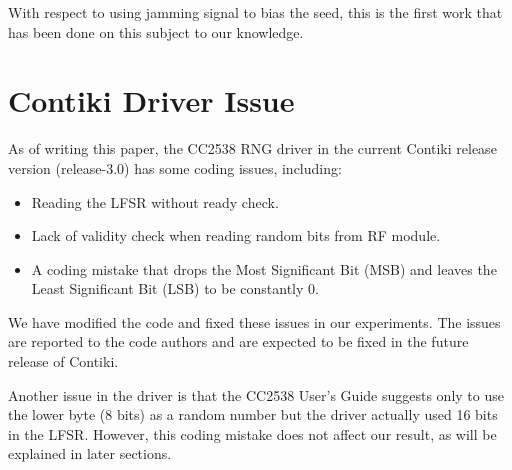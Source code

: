 With respect to using jamming signal to bias the seed, this is the first work that has been done on this subject to our knowledge.

\section{Contiki Driver Issue}
As of writing this paper,  the CC2538 RNG driver in the current Contiki release version (release-3.0) has some coding issues, including:
\begin{itemize}
	\item Reading the LFSR without ready check.
	\item Lack of validity check when reading random bits from RF module.
	\item A coding mistake that drops the Most Significant Bit (MSB) and leaves the Least Significant Bit (LSB) to be constantly $0$.
\end{itemize}

We have modified the code and fixed these issues in our experiments. The issues are reported to the code authors and are expected to be fixed in the future release of Contiki.

Another issue in the driver is that the CC2538 User's Guide\cite{CC2538Manual} suggests only to use the lower byte (8 bits) as a random number but the driver actually used 16 bits in the LFSR. However, this coding mistake does not affect our result, as will be explained in  later sections.